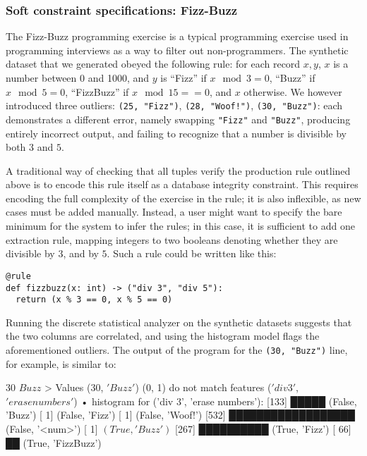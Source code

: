 \subsubsection{Soft constraint specifications: Fizz-Buzz}
The Fizz-Buzz programming exercise is a typical programming exercise used in programming interviews as a way to filter out non-programmers. The synthetic dataset that we generated obeyed the following rule: for each record \(x, y\), $x$ is a number between 0 and 1000, and $y$ is ``Fizz'' if \(x \mod 3 = 0\), ``Buzz'' if \(x \mod 5 = 0\), ``FizzBuzz'' if \(x \mod 15 == 0\), and \(x\) otherwise. We however introduced three outliers: \texttt{(25, "Fizz")}, \texttt{(28, "Woof!")}, \texttt{(30, "Buzz")}: each demonstrates a different error, namely swapping \texttt{"Fizz"} and \texttt{"Buzz"}, producing entirely incorrect output, and failing to recognize that a number is divisible by both $3$ and $5$.

A traditional way of checking that all tuples verify the production rule outlined above is to encode this rule itself as a database integrity constraint. This requires encoding the full complexity of the exercise in the rule; it is also inflexible, as new cases must be added manually. Instead, a user might want to specify the bare minimum for the system to infer the rules; in this case, it is sufficient to add one extraction rule, mapping integers to two booleans denoting whether they are divisible by $3$, and by $5$. Such a rule could be written like this:

\begin{verbatim}
@rule
def fizzbuzz(x: int) -> ("div 3", "div 5"):
  return (x % 3 == 0, x % 5 == 0)
\end{verbatim}

Running the discrete statistical analyzer on the synthetic datasets suggests that the two columns are correlated, and using the histogram model flags the aforementioned outliers. The output of the program for the \texttt{(30, "Buzz")} line, for example, is similar to:

\begin{lstnobreak}[gobble=2]
   $30$ $Buzz$
   > Values ($30$, $'Buzz'$) (0, 1) do not match
     features ($'div 3'$, $'erase numbers'$)
     • histogram for ('div 3', 'erase numbers'):
       [133] █████ (False, 'Buzz')
       [  1] (False, 'Fizz')
       [  1] (False, 'Woof!')
       [532] ██████████████████ (False, '<num>')
       [  1] $(True, 'Buzz')$
       [267] ██████████ (True, 'Fizz')
       [ 66] ██ (True, 'FizzBuzz')
\end{lstnobreak}

